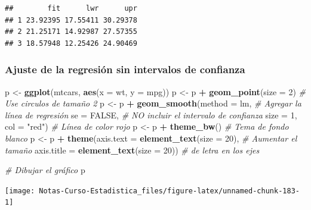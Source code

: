\documentclass[
  12pt,
]{book}
\newenvironment{Shaded}{\begin{snugshade}}{\end{snugshade}}
\newcommand{\CommentTok}[1]{\textcolor[rgb]{0.56,0.35,0.01}{\textit{#1}}}
\newcommand{\DataTypeTok}[1]{\textcolor[rgb]{0.13,0.29,0.53}{#1}}
\newcommand{\DecValTok}[1]{\textcolor[rgb]{0.00,0.00,0.81}{#1}}
\newcommand{\KeywordTok}[1]{\textcolor[rgb]{0.13,0.29,0.53}{\textbf{#1}}}
\newcommand{\NormalTok}[1]{#1}
\newcommand{\OperatorTok}[1]{\textcolor[rgb]{0.81,0.36,0.00}{\textbf{#1}}}
\newcommand{\OtherTok}[1]{\textcolor[rgb]{0.56,0.35,0.01}{#1}}
\newcommand{\StringTok}[1]{\textcolor[rgb]{0.31,0.60,0.02}{#1}}
\theoremstyle{definition}
\theoremstyle{definition}
\theoremstyle{definition}
\theoremstyle{remark}
\begin{document}
\begin{verbatim}
##        fit      lwr      upr
## 1 23.92395 17.55411 30.29378
## 2 21.25171 14.92987 27.57355
## 3 18.57948 12.25426 24.90469
\end{verbatim}

\hypertarget{ajuste-de-la-regresiuxf3n-sin-intervalos-de-confianza}{%
\subsubsection{Ajuste de la regresión sin intervalos de confianza}\label{ajuste-de-la-regresiuxf3n-sin-intervalos-de-confianza}}

\begin{Shaded}
\begin{Highlighting}[]
\NormalTok{p <-}\StringTok{ }\KeywordTok{ggplot}\NormalTok{(mtcars, }\KeywordTok{aes}\NormalTok{(}\DataTypeTok{x =}\NormalTok{ wt, }\DataTypeTok{y =}\NormalTok{ mpg)) }
\NormalTok{p <-}\StringTok{ }\NormalTok{p }\OperatorTok{+}\StringTok{ }\KeywordTok{geom_point}\NormalTok{(}\DataTypeTok{size =} \DecValTok{2}\NormalTok{)       }\CommentTok{# Use circulos de tamaño 2}
\NormalTok{p <-}\StringTok{ }\NormalTok{p }\OperatorTok{+}\StringTok{ }\KeywordTok{geom_smooth}\NormalTok{(}\DataTypeTok{method =}\NormalTok{ lm,   }\CommentTok{# Agregar la línea de regresión }
              \DataTypeTok{se =} \OtherTok{FALSE}\NormalTok{,           }\CommentTok{# NO incluir el intervalo de confianza   }
              \DataTypeTok{size =} \DecValTok{1}\NormalTok{,}
              \DataTypeTok{col =} \StringTok{"red"}\NormalTok{)          }\CommentTok{# Línea de color rojo }
\NormalTok{p <-}\StringTok{ }\NormalTok{p }\OperatorTok{+}\StringTok{ }\KeywordTok{theme_bw}\NormalTok{()                 }\CommentTok{# Tema de fondo blanco}
\NormalTok{p <-}\StringTok{ }\NormalTok{p }\OperatorTok{+}\StringTok{ }\KeywordTok{theme}\NormalTok{(}\DataTypeTok{axis.text =} \KeywordTok{element_text}\NormalTok{(}\DataTypeTok{size =} \DecValTok{20}\NormalTok{),  }\CommentTok{# Aumentar el tamaño }
               \DataTypeTok{axis.title =} \KeywordTok{element_text}\NormalTok{(}\DataTypeTok{size =} \DecValTok{20}\NormalTok{)) }\CommentTok{# de letra en los ejes}

\CommentTok{# Dibujar el gráfico}
\NormalTok{p   }
\end{Highlighting}
\end{Shaded}

\begin{center}\texttt{[image: Notas-Curso-Estadistica\_files/figure-latex/unnamed-chunk-183-1]} \end{center}
\end{document}
